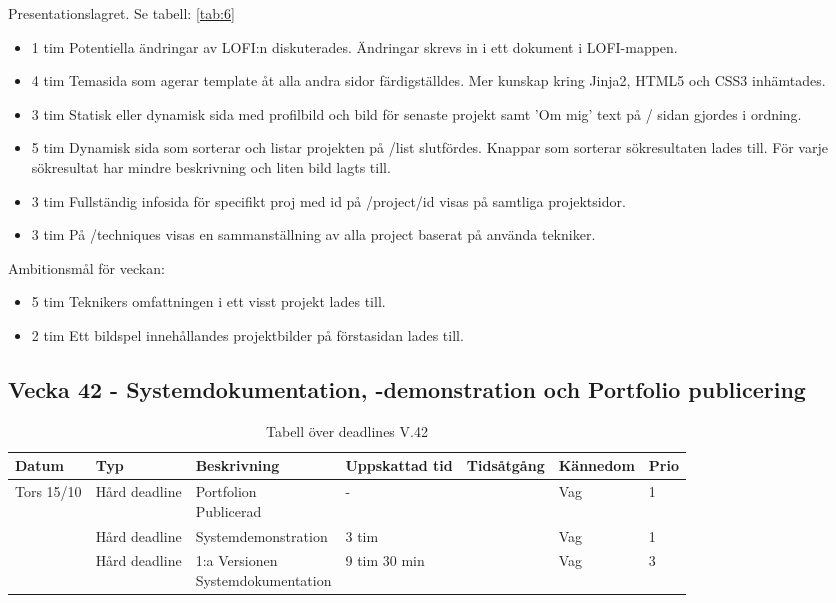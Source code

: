 \documentclass{TDP003mall}
\begin{document}
Presentationslagret. Se tabell: \ref{tab:6}
\begin{itemize}
  \item 1 tim Potentiella ändringar av LOFI:n diskuterades. Ändringar skrevs in i ett dokument i LOFI-mappen.
  \item 4 tim Temasida som agerar template åt alla andra sidor färdigställdes. Mer kunskap kring Jinja2, HTML5 och CSS3 inhämtades.
  \item 3 tim Statisk eller dynamisk sida med profilbild och bild för senaste projekt samt 'Om mig' text på / sidan gjordes i ordning.
  \item 5 tim Dynamisk sida som sorterar och listar projekten på /list slutfördes. Knappar som sorterar sökresultaten lades till. För varje sökresultat har mindre beskrivning och liten bild lagts till.                  
  \item 3 tim Fullständig infosida för specifikt proj med id på /project/id visas på samtliga projektsidor.
  \item 3 tim På /techniques visas en sammanställning av alla project baserat på använda tekniker.
\end{itemize}

Ambitionsmål för veckan:
\begin{itemize}
\item 5 tim Teknikers omfattningen i ett visst projekt lades till.
\item 2 tim Ett bildspel innehållandes projektbilder på förstasidan lades till.
\end{itemize}

\subsection*{Vecka 42 - Systemdokumentation, -demonstration och Portfolio publicering}
\begin{table}[h!]
        \caption{Tabell över deadlines V.42\label{tab:7}}
\begin{tabularx}{\linewidth}{|l|l|X|l|l|l|l|}
  \hline
  Datum            & Typ           & Beskrivning                                         & Uppskattad tid & Tidsåtgång & Kännedom & Prio \\ [0.5ex]
  \hline                                             
        Tors 15/10 & Hård deadline & \makecell[tl]{Portfolion\\ Publicerad}              & -              &            & Vag      & 1 \\ \hline
                   & Hård deadline & Systemdemonstration                                 & 3 tim          &            & Vag      & 1    \\
  \hline                                             
                   & Hård deadline & \makecell[tl]{1:a Versionen \\ Systemdokumentation} & 9 tim 30 min   &            & Vag      & 3 \\
  \hline
\end{tabularx}
    \end{table}
    
\end{document}
